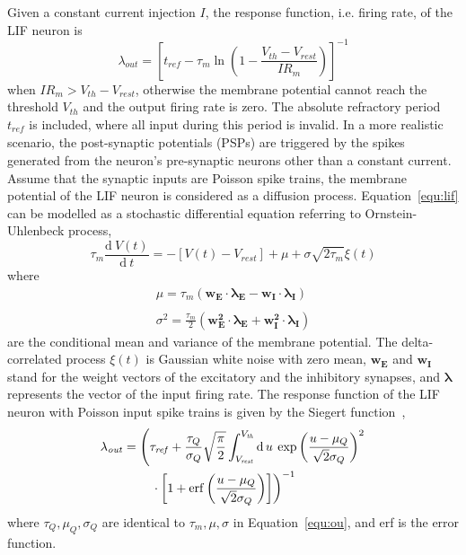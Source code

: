 \documentclass[journal]{journal}
\def\D{\mathrm{d}}
\begin{document}
Given a constant current injection $I$, the response function, i.e. firing rate, of the LIF neuron is
\begin{equation}
\lambda_\mathit{out}=
\left [ t_\mathit{ref}-\tau_m\ln \left ( 1-\frac{V_{th}-V_\mathit{rest}}{IR_m}  \right )\right ]^{-1}
\label{equ:consI}
\end{equation}
when $IR_m>V_{th}-V_{rest}$, otherwise the membrane potential cannot reach the threshold $V_{th}$ and the output firing rate is zero. 
The absolute refractory period $t_\mathit{ref}$ is included, where all input during this period is invalid.
In a more realistic scenario, the post-synaptic potentials (PSPs) are triggered by the spikes generated from the neuron's pre-synaptic neurons other than a constant current.
Assume that the synaptic inputs are Poisson spike trains, the membrane potential of the LIF neuron is considered as a diffusion process. Equation~\ref{equ:lif} can be modelled as a stochastic differential equation referring to Ornstein-Uhlenbeck process,
\begin{equation}
\tau_m\frac{\D\:V(t)}{\D\:  t}=-\left[V(t)-V_\mathit{rest}\right] + \mu + \sigma\sqrt{2\tau_m}\xi (t)
\label{equ:sde}
\end{equation}
where
\begin{equation}
\begin{array}{l}
\mu=\tau_m(\mathbf{w_E\cdot\lambda_E}-\mathbf{w_I\cdot\lambda_I})
\\
\\
\sigma ^{2} = \frac{\tau_m}{2}\left(\mathbf{w_E^{2}\cdot\lambda_E}+\mathbf{w_I^{2}\cdot\lambda_I}\right)
\end{array}
\label{equ:ou}
\end{equation}
are the conditional mean and variance of the membrane potential.
The delta-correlated process $\xi(t)$ is Gaussian white noise with zero mean, $\mathbf{w_E}$ and $\mathbf{w_I}$ stand for the weight vectors of the excitatory and the inhibitory synapses, and $\mathbf{\lambda}$ represents the vector of the input firing rate.
The response function of the LIF neuron with Poisson input spike trains is given by the Siegert function~\cite{siegert1951first}, 
\begin{align}
\lambda_\mathit{out} &=\left(\tau_\mathit{ref} + \frac{\tau_Q}{\sigma_Q}\sqrt{\frac{\pi}{2}} \int_{V_\mathit{rest}}^{V_\mathit{th}}\D\,u \:\exp \left(\frac{u-\mu_Q}{\sqrt2\sigma_Q} \right )^{2} \right. \nonumber \\
&\qquad \left. \vphantom{\int_t} \cdot  \left[1+\mathrm{erf} \left(\frac{u-\mu_Q}{\sqrt2\sigma_Q} \right ) \right ]\right)^{-1}
\label{equ:sgt}
\end{align}
where $\tau_Q, \mu_Q, \sigma_Q$ are identical to $\tau_m, \mu, \sigma$ in Equation~\ref{equ:ou}, and erf is the error function.
\end{document}
